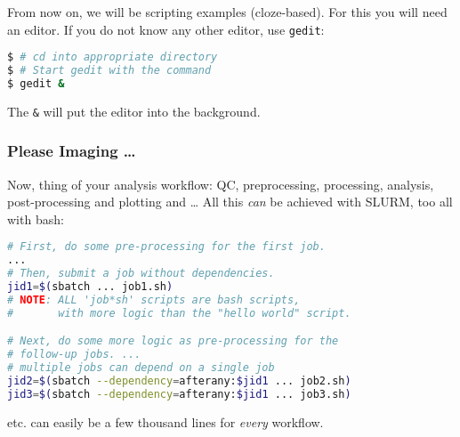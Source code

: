 \setcounter{preframe_handson}{\value{handson}}
\begin{frame}[fragile]
  \setcounter{handson}{\value{preframe_handson}}
  \frametitle{}
  \begin{hint}
  	    From now on, we will be scripting examples (cloze-based). For this you will
        need an editor. If you do not know any other editor, use \texttt{gedit}:
  \end{hint}
  \begin{lstlisting}[language=Bash, style=Shell, basicstyle=\scriptsize]
$ # cd into appropriate directory
$ # Start gedit with the command 
$ gedit &
  \end{lstlisting}
  \begin{hint}
  	The \texttt{\&} will put the editor into the background.
  \end{hint} 
\end{frame}



\begin{frame}[fragile]%
	\frametitle{Please Imaging \ldots}
	Now, thing of your analysis workflow: QC, preprocessing, processing, analysis, post-processing and plotting and \ldots \newline
	\pause
	All this \emph{can} be achieved with SLURM, too all with bash:
	\begin{lstlisting}[language=Bash, style=Shell]
# First, do some pre-processing for the first job.
...
# Then, submit a job without dependencies.
jid1=$(sbatch ... job1.sh)
# NOTE: ALL 'job*sh' scripts are bash scripts,
#       with more logic than the "hello world" script.		

# Next, do some more logic as pre-processing for the 
# follow-up jobs. ...
# multiple jobs can depend on a single job
jid2=$(sbatch --dependency=afterany:$jid1 ... job2.sh)
jid3=$(sbatch --dependency=afterany:$jid1 ... job3.sh)
	\end{lstlisting}
    etc. can easily be a few thousand lines for \emph{every} workflow.
	\vfill
\end{frame}


